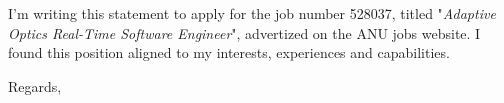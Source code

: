 \documentclass[11pt,a4paper,calibri]{moderncv}
\begin{document}

\date{\today}

\opening{
    I'm writing this statement to apply for the job number 528037, titled "\textit{Adaptive Optics Real-Time Software Engineer}", advertized on the ANU jobs website.
    I found this position aligned to my interests, experiences and capabilities.
}

\closing{Regards,}

\makelettertitle


\end{document}
